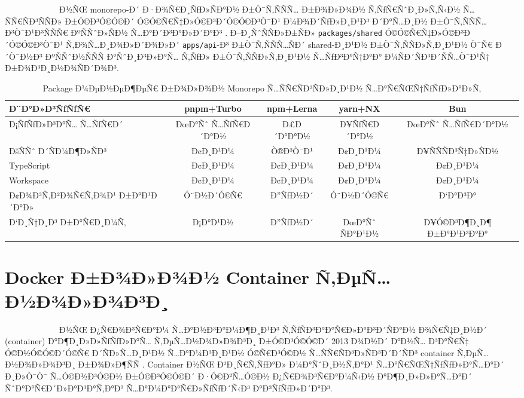 \documentclass[12pt,A4]{report}
\begin{document}
\ \ \ \ \ \ \ \ \  \ \ \ \ \Turborepo Ð½ÑŒ monorepo-Ð´ Ð·Ð¾Ñ€Ð¸ÑƒÐ»ÑÐ°Ð½
Ð±Ò¯Ñ‚ÑÑÑ… Ð±Ð¾Ð»Ð¾Ð½ Ñ‚ÑƒÑ€ÑˆÐ¸Ð»Ñ‚Ñ‹Ð½ Ñ…ÑÑ€ÑÐ³ÑÑÐ» Ð±Ó©Ð³Ó©Ó©Ð´ Ó©Ó©Ñ€Ñ‡Ð»Ó©Ð³Ð´Ó©Ó©Ð³Ò¯Ð¹ Ð¼Ð¾Ð´ÑƒÐ»Ð¸Ð¹Ð³
Ð´Ð°Ñ…Ð¸Ð½ Ð±Ò¯Ñ‚ÑÑÑ…Ð³Ò¯Ð¹Ð³ÑÑÑ€ ÐºÑÑˆÐ»ÑÐ½ Ñ…Ð°Ð´Ð³Ð°Ð»Ð´Ð°Ð³ \cite{turborepo2024}.
Ð–Ð¸ÑˆÑÑÐ»Ð±ÑÐ» \texttt{packages/shared} Ó©Ó©Ñ€Ñ‡Ð»Ó©Ð³Ð´Ó©Ó©Ð³Ò¯Ð¹ Ñ‚Ð¾Ñ…Ð¸Ð¾Ð»Ð´Ð¾Ð»Ð´
\texttt{apps/api}-Ð³ Ð±Ò¯Ñ‚ÑÑÑ…ÑÐ´ shared-Ð¸Ð¹Ð½ Ð±Ò¯Ñ‚ÑÑÐ»Ñ‚Ð¸Ð¹Ð½ Ò¯Ñ€ Ð´Ò¯Ð½Ð³
ÐºÑÑˆÐ½ÑÑÑ Ð°ÑˆÐ¸Ð³Ð»Ð°Ñ… Ñ‚ÑƒÐ» Ð±Ò¯Ñ‚ÑÑÐ»Ñ‚Ð¸Ð¹Ð½ Ñ…ÑƒÐ³Ð°Ñ†Ð°Ð° Ð¼ÑÐ´ÑÐ³Ð´ÑÑ…Ò¯Ð¹Ñ† Ð±Ð¾Ð³Ð¸Ð½Ð¾ÑÐ´Ð¾Ð³.

\begin{table}[h]
\centering
\caption{Package Ð¼ÐµÐ½ÐµÐ¶ÐµÑ€ Ð±Ð¾Ð»Ð¾Ð½ Monorepo Ñ…ÑÑ€ÑÐ³ÑÐ»Ð¸Ð¹Ð½ Ñ…Ð°Ñ€ÑŒÑ†ÑƒÑƒÐ»Ð°Ð»Ñ‚}
\begin{tabular}{|l|c|c|c|c|}
\hline
\textbf{Ð¨Ð°Ð»Ð³ÑƒÑƒÑ€} & \textbf{pnpm+Turbo} & \textbf{npm+Lerna} &
\textbf{yarn+NX} & \textbf{Bun} \\
\hline
Ð¡ÑƒÑƒÐ»Ð³Ð°Ñ… Ñ…ÑƒÑ€Ð´     & ÐœÐ°Ñˆ Ñ…ÑƒÑ€Ð´Ð°Ð½ & Ð£Ð´Ð°Ð°Ð½  & Ð¥ÑƒÑ€Ð´Ð°Ð½ & ÐœÐ°Ñˆ Ñ…ÑƒÑ€Ð´Ð°Ð½ \\
ÐšÑÑˆ Ð´ÑÐ¼Ð¶Ð»ÑÐ³     & Ð¢Ð¸Ð¹Ð¼       & Ò®Ð³Ò¯Ð¹   & Ð¢Ð¸Ð¹Ð¼   & Ð¥ÑÑÑÐ³Ñ‡Ð»ÑÐ½ \\
TypeScript       & Ð¢Ð¸Ð¹Ð¼       & Ð¢Ð¸Ð¹Ð¼   & Ð¢Ð¸Ð¹Ð¼   & Ð¢Ð¸Ð¹Ð¼ \\
Workspace        & Ð¢Ð¸Ð¹Ð¼       & Ð¢Ð¸Ð¹Ð¼   & Ð¢Ð¸Ð¹Ð¼   & Ð¢Ð¸Ð¹Ð¼ \\
Ð¢Ð¾Ð³Ñ‚Ð²Ð¾Ñ€Ñ‚Ð¾Ð¹ Ð±Ð°Ð¹Ð´Ð°Ð» & Ó¨Ð½Ð´Ó©Ñ€     & Ð”ÑƒÐ½Ð´   & Ó¨Ð½Ð´Ó©Ñ€  & Ð‘Ð°Ð³Ð° \\
Ð‘Ð¸Ñ‡Ð¸Ð³ Ð±Ð°Ñ€Ð¸Ð¼Ñ‚     & Ð¡Ð°Ð¹Ð½       & Ð”ÑƒÐ½Ð´   & ÐœÐ°Ñˆ ÑÐ°Ð¹Ð½ & Ð¥Ó©Ð³Ð¶Ð¸Ð¶ Ð±Ð°Ð¹Ð³Ð°Ð° \\
\hline
\end{tabular}
\label{tab:monorepo_comparison}
\end{table}

\section{Docker Ð±Ð¾Ð»Ð¾Ð½ Container Ñ‚ÐµÑ…Ð½Ð¾Ð»Ð¾Ð³Ð¸}

\ \ \ \ \ \ \ \ \  \ \ \ \ \Docker Ð½ÑŒ Ð¿Ñ€Ð¾Ð³Ñ€Ð°Ð¼ Ñ…Ð°Ð½Ð³Ð°Ð¼Ð¶Ð¸Ð¹Ð³
Ñ‚ÑƒÑÐ³Ð°Ð°Ñ€Ð»Ð°Ð³Ð´ÑÐ°Ð½ Ð¾Ñ€Ñ‡Ð¸Ð½Ð´ (container) Ð°Ð¶Ð¸Ð»Ð»ÑƒÑƒÐ»Ð°Ñ… Ñ‚ÐµÑ…Ð½Ð¾Ð»Ð¾Ð³Ð¸ Ð±Ó©Ð³Ó©Ó©Ð´
2013 Ð¾Ð½Ð´ Ð°Ð½Ñ… Ð³Ð°Ñ€Ñ‡ Ó©Ð½Ó©Ó©Ð´Ó©Ñ€ Ð´ÑÐ»Ñ…Ð¸Ð¹Ð½ Ñ…Ð°Ð¼Ð³Ð¸Ð¹Ð½ Ó©Ñ€Ð³Ó©Ð½ Ñ…ÑÑ€ÑÐ³Ð»ÑÐ³Ð´Ð´ÑÐ³
container Ñ‚ÐµÑ…Ð½Ð¾Ð»Ð¾Ð³Ð¸ Ð±Ð¾Ð»Ð¶ÑÑ \cite{docker2024}. Container Ð½ÑŒ
Ð²Ð¸Ñ€Ñ‚ÑƒÐ°Ð» Ð¼Ð°ÑˆÐ¸Ð½Ñ‚Ð°Ð¹ Ñ…Ð°Ñ€ÑŒÑ†ÑƒÑƒÐ»Ð°Ñ…Ð°Ð´ Ð¸Ð»Ò¯Ò¯ Ñ…Ó©Ð½Ð³Ó©Ð½ Ð±Ó©Ð³Ó©Ó©Ð´ Ð·Ó©Ð²Ñ…Ó©Ð½
Ð¿Ñ€Ð¾Ð³Ñ€Ð°Ð¼Ñ‹Ð½ Ð°Ð¶Ð¸Ð»Ð»Ð°Ñ…Ð°Ð´ ÑˆÐ°Ð°Ñ€Ð´Ð»Ð°Ð³Ð°Ñ‚Ð°Ð¹ Ñ…Ð°Ð¼Ð°Ð°Ñ€Ð»ÑƒÑƒÐ´Ñ‹Ð³ Ð°Ð³ÑƒÑƒÐ»Ð´Ð°Ð³.
\end{document}
